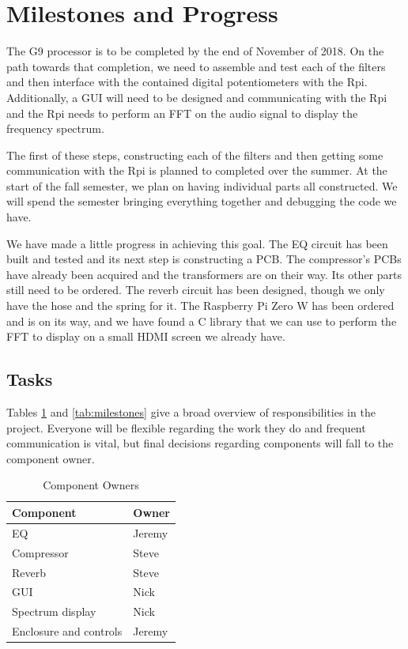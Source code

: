 \documentclass[journal]{IEEEtran}
\begin{document}
	\section{Milestones and Progress}
	The G9 processor is to be completed by the end of November of 2018.  On the path towards that completion, we need to assemble and test each of the filters and then interface with the contained digital potentiometers with the Rpi.  Additionally, a GUI will need to be designed and communicating with the Rpi and the Rpi needs to perform an FFT on the audio signal to display the frequency spectrum.  
	
	The first of these steps, constructing each of the filters and then getting some communication with the Rpi is planned to completed over the summer.  At the start of the fall semester, we plan on having individual parts all constructed.  We will spend the semester bringing everything together and debugging the code we have.
	
	We have made a little progress in achieving this goal.  The EQ circuit has been built and tested and its next step is constructing a PCB.  The compressor's PCBs have already been acquired and the transformers are on their way.  Its other parts still need to be ordered.  The reverb circuit has been designed, though we only have the hose and the spring for it.  The Raspberry Pi Zero W has been ordered and is on its way, and we have found a C library that we can use to perform the FFT to display on a small HDMI screen we already have.
	
	\subsection{Tasks}
	
	Tables \ref{tab:owners} and \ref{tab:milestones} give a broad overview of responsibilities in the project. Everyone will be flexible regarding the work they do and frequent communication is vital, but final decisions regarding components will fall to the component owner.
	
	\begin{table}[H]
		\centering
		\caption{Component Owners}
		\label{tab:owners}
		\begin{tabular}{l|l}
			Component                     & Owner \\ \hline
			EQ                     & Jeremy \\
			Compressor             & Steve  \\
			Reverb                 & Steve  \\
			GUI                    & Nick   \\
			Spectrum display       & Nick   \\
			Enclosure and controls & Jeremy
		\end{tabular}
	\end{table}
\end{document}
